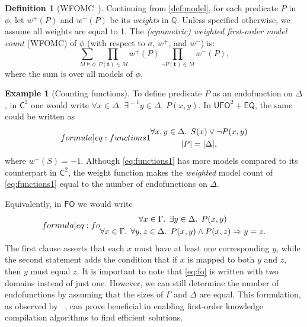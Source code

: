 \documentclass[letterpaper]{article} %
\theoremstyle{remark}
\theoremstyle{definition}
\newtheorem{definition}{Definition}
\newtheorem{example}{Example}
\newcommand{\Ctwo}{$\mathsf{C}^{2}$}
\newcommand{\FO}{$\mathsf{FO}$}
\newcommand{\UFO}{$\mathsf{UFO}^{2} + \mathsf{EQ}$}
\begin{document}
\begin{definition}[WFOMC~\cite{DBLP:conf/ijcai/BroeckTMDR11}]
  Continuing from \cref{def:model}, for each predicate $P$ in $\phi$, let
  $w^{+}(P)$ and $w^{-}(P)$ be its \emph{weights} in $\mathbb{Q}$. Unless
  specified otherwise, we assume all weights are equal to 1. The
  \emph{(symmetric) weighted first-order model count} (WFOMC) of $\phi$ (with
  respect to $\sigma$, $w^{+}$, and $w^{-}$) is:
  \[
    \sum_{M \models \phi} \prod_{P(\mathbf{t}) \in M} w^{+}(P) \prod_{\neg P(\mathbf{t}) \in M} w^{-}(P),
  \]
  where the sum is over all models of $\phi$.
\end{definition}

\begin{example}[Counting functions]\label{example:functions}
  To define predicate $P$ as an endofunction on $\Delta$, in \Ctwo{} one would
  write $\forall x \in \Delta\text{. }\exists^{=1} y \in \Delta\text{.
  }P(x, y)$. In \UFO{}, the same could be written as
  \begin{equation}\label[formula]{eq:functions1}
    \begin{gathered}
      \forall x, y \in \Delta\text{. }S(x) \lor \neg P(x, y)\\
      |P| = |\Delta|,
    \end{gathered}
  \end{equation}
  where $w^{-}(S) = -1$. Although \cref{eq:functions1} has more models compared
  to its counterpart in \Ctwo{}, the weight function makes the \emph{weighted}
  model count of \cref{eq:functions1} equal to the number of endofunctions on
  $\Delta$.

  Equivalently, in \FO{} we would write
  \begin{equation}\label[formula]{eq:fo}
    \begin{gathered}
      \forall x \in \Gamma\text{. }\exists y \in \Delta\text{. }P(x, y)\\
      \forall x \in \Gamma\text{. }\forall y, z \in \Delta\text{. }P(x, y) \land P(x, z) \Rightarrow y = z.
    \end{gathered}
  \end{equation}
  The first clause asserts that each $x$ must have at least one corresponding
  $y$, while the second statement adds the condition that if $x$ is mapped to
  both $y$ and $z$, then $y$ must equal $z$. It is important to note that
  \cref{eq:fo} is written with two domains instead of just one. However, we can
  still determine the number of endofunctions by assuming that the sizes of
  $\Gamma$ and $\Delta$ are equal. This formulation, as observed by
  \citeauthor{DBLP:conf/kr/DilkasB23}~, can
  prove beneficial in enabling first-order knowledge compilation algorithms to
  find efficient solutions.
\end{example}
\end{document}
